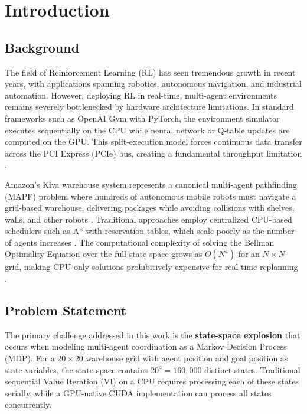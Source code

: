 \documentclass[12pt,a4paper]{article}
\begin{document}


\renewcommand*\contentsname{Table of Contents}
\tableofcontents
\newpage
\listoffigures
\newpage
\listoftables
\newpage
{}

\section{Introduction}

\subsection{Background}
The field of Reinforcement Learning (RL) has seen tremendous growth in recent years, with applications spanning robotics, autonomous navigation, and industrial automation. However, deploying RL in real-time, multi-agent environments remains severely bottlenecked by hardware architecture limitations. In standard frameworks such as OpenAI Gym with PyTorch, the environment simulator executes sequentially on the CPU while neural network or Q-table updates are computed on the GPU. This split-execution model forces continuous data transfer across the PCI Express (PCIe) bus, creating a fundamental throughput limitation \cite{kirk2016programming}.

Amazon's Kiva warehouse system represents a canonical multi-agent pathfinding (MAPF) problem where hundreds of autonomous mobile robots must navigate a grid-based warehouse, delivering packages while avoiding collisions with shelves, walls, and other robots \cite{wurman2008coordinating}. Traditional approaches employ centralized CPU-based schedulers such as A* with reservation tables, which scale poorly as the number of agents increases \cite{ma2016lifelong}. The computational complexity of solving the Bellman Optimality Equation over the full state space grows as $O(N^4)$ for an $N \times N$ grid, making CPU-only solutions prohibitively expensive for real-time replanning \cite{bellman1957markovian}.

\subsection{Problem Statement}
The primary challenge addressed in this work is the \textbf{state-space explosion} that occurs when modeling multi-agent coordination as a Markov Decision Process (MDP). For a $20 \times 20$ warehouse grid with agent position and goal position as state variables, the state space contains $20^4 = 160,000$ distinct states. Traditional sequential Value Iteration (VI) on a CPU requires processing each of these states serially, while a GPU-native CUDA implementation can process all states concurrently.
\end{document}
